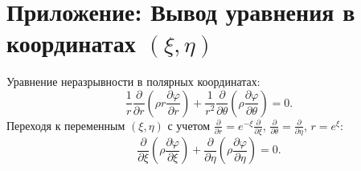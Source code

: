 \documentclass[a4paper,12pt]{article}
\begin{document}
	\section{Приложение: Вывод уравнения в координатах $(\xi, \eta)$}	
	Уравнение неразрывности в полярных координатах:
	\[
	\frac{1}{r} \frac{\partial}{\partial r} \left( \rho r \frac{\partial \varphi}{\partial r} \right) + \frac{1}{r^2} \frac{\partial}{\partial \theta} \left( \rho \frac{\partial \varphi}{\partial \theta} \right) = 0.
	\]
	Переходя к переменным $(\xi, \eta)$ с учетом $\frac{\partial}{\partial r} = e^{-\xi} \frac{\partial}{\partial \xi}$, $\frac{\partial}{\partial \theta} = \frac{\partial}{\partial \eta}$, $r = e^{\xi}$:
	\[
	\frac{\partial}{\partial \xi} \left( \rho \frac{\partial \varphi}{\partial \xi} \right) + \frac{\partial}{\partial \eta} \left( \rho \frac{\partial \varphi}{\partial \eta} \right) = 0.
	\]
\end{document}
